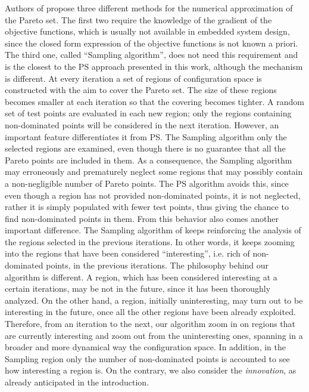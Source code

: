 Authors of \cite{dellnitz2005covering,dellnitz2009computation} propose
three different methods for the numerical approximation of the Pareto
set. The first two require the knowledge of the gradient of the
objective functions, which is usually not available in embedded system
design, since the closed form expression of the objective functions is
not known a priori. The third one, called ``Sampling algorithm'', does
not need this requirement and is the closest to the PS approach
presented in this work, although the
mechanism is different. At every iteration a set of regions of
configuration space is constructed with the aim to cover the Pareto
set. The size of these regions becomes smaller at each iteration so
that the covering becomes tighter. A random set of test points are
evaluated in each new region; only the regions containing
non-dominated points will be considered in the next iteration.
However, an important feature differentiates it from PS. The Sampling algorithm only the
selected regions are examined, even though there is no guarantee that
all the Pareto points are included in them. As a consequence, the
Sampling algorithm may erroneously and prematurely neglect some
regions that may possibly contain a non-negligible number of Pareto
points. The PS algorithm avoids this, since even though a region has not
provided non-dominated points, it is not neglected, rather it is
simply populated with fewer test points, thus giving the chance to
find non-dominated points in them. From this behavior also comes
another important difference. The Sampling algorithm of
\cite{dellnitz2005covering} keeps reinforcing the analysis of the
regions selected in the previous iterations. In other words, it keeps
zooming into the regions that have been considered ``interesting'',
i.e. rich of non-dominated points, in the previous iterations. The
philosophy behind our algorithm is different. A region, which has been
considered interesting at a certain iterations, may be not in the
future, since it has been thoroughly analyzed. On the other hand, a
region, initially uninteresting, may turn out to be interesting in the
future, once all the other regions have been already exploited.
Therefore, from an iteration to the next, our algorithm zoom in on
regions that are currently interesting and zoom out from the
uninteresting ones,  spanning in a broader and more dynamical way the
configuration space. In addition, in the Sampling region only the
number of non-dominated points is accounted to see how interesting a
region is. On the contrary, we also consider the \emph{innovation}, as
already anticipated in the introduction.

